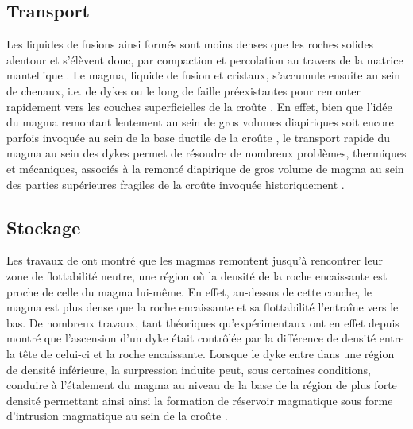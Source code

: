 \subsection{Transport}
\label{C1-sec:transport}

Les liquides de fusions ainsi formés  sont moins denses que les roches
solides alentour et  s'élèvent donc, par compaction  et percolation au
travers          de           la          matrice          mantellique
\citep{McKenzy:1984bo,McKenzie:1985jq}. Le magma, liquide de fusion et
cristaux, s'accumule ensuite au sein de  chenaux, i.e.  de dykes ou le
long de faille préexistantes pour remonter rapidement vers les couches
superficielles               de                la               croûte
\citep{Lister:1991ut,Clemens:1992kr,Petford:1993bk,Rubin:1995upa}.  En
effet, bien  que l'idée du magma  remontant lentement au sein  de gros
volumes diapiriques  soit encore parfois  invoquée au sein de  la base
ductile  de  la   croûte  \citep{Weinberg:1994jg,Weinberg:1996vb},  le
transport rapide  du magma  au sein  des dykes  permet de  résoudre de
nombreux problèmes,  thermiques et  mécaniques, associés à  la remonté
diapirique de  gros volume  de magma au  sein des  parties supérieures
fragiles de la croûte invoquée historiquement \citep{Miller:1999km}.

\subsection{Stockage}
\label{C1-sec:stockage}

Les  travaux  de  \citet{Walker:1989jq}  ont  montré  que  les  magmas
remontent  jusqu'à rencontrer  leur zone  de flottabilité  neutre, une
région où  la densité de la  roche encaissante est proche  de celle du
magma lui-même. En effet, au-dessus de cette couche, le magma est plus
dense que la  roche encaissante et sa flottabilité  l'entraîne vers le
bas.        De      nombreux       travaux,      tant       théoriques
\citep{Lister:1991ut,Petford:1993bk,Rubin:1995upa}    qu'expérimentaux
\citep{Taisne:2009kj,Taisne:2011do}  ont en  effet  depuis montré  que
l'ascension d'un  dyke était  contrôlée par  la différence  de densité
entre la  tête de celui-ci  et la  roche encaissante. Lorsque  le dyke
entre dans  une région de  densité inférieure, la  surpression induite
peut, sous  certaines conditions, conduire  à l'étalement du  magma au
niveau de la base de la  région de plus forte densité permettant ainsi
ainsi  la formation  de  réservoir magmatique  sous forme  d'intrusion
magmatique au sein de la croûte \citep{Taisne:2011do}.

